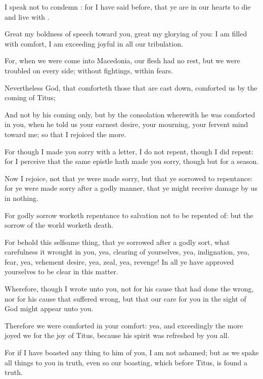 {I
speak
not
{}
to
condemn
{}:
for I have said
before,
that ye
are
in
our
hearts
to
die
and live
with
{}.

Great
{}
my boldness of
speech
toward
you,
great
{}
my
glorying
of
you: I am
filled with
comfort, I am
exceeding
joyful
in
all
our
tribulation.

For,
when we were
come
into
Macedonia,
our
flesh
had
no
rest,
but
we were
troubled
on every
side;
without
{}
fightings,
within
{}
fears.

Nevertheless
God, that
comforteth
those that are cast
down,
comforted
us
by the
coming of
Titus;

And
not
by
his
coming
only,
but
by the
consolation
wherewith he was
comforted
in
you, when he
told
us
your earnest
desire,
your
mourning,
your fervent
mind
toward
me; so
that
I
rejoiced the
more.

For though I
made
you sorry
with a
letter, I
do
not
repent,
though I did
repent:
for I
perceive
that the
same
epistle hath
made
you
sorry,
though
{}
but
for a
season.

Now I
rejoice,
not
that ye were made
sorry,
but
that ye
sorrowed
to
repentance:
for ye were made
sorry
after a godly
manner,
that ye might receive
damage
by
us
in
nothing.

For
godly
sorrow
worketh
repentance
to
salvation not to be repented
of:
but the
sorrow of the
world
worketh
death.

For
behold
this selfsame
thing,
that
ye
sorrowed
after a godly
sort,
what
carefulness it
wrought in
you,
yea,
{} clearing of
yourselves,
yea,
{}
indignation,
yea,
{}
fear,
yea,
{} vehement
desire,
yea,
{}
zeal,
yea,
{}
revenge!
In
all
{} ye have
approved
yourselves to
be
clear
in this
matter.

Wherefore,
though I
wrote unto
you,
{}
not for his
cause
that had done the
wrong,
nor for his
cause that suffered
wrong,
but that
our
care
for
you in the
sight of
God might
appear
unto
you.

Therefore we were
comforted
in
your
comfort: yea,
and
exceedingly the
more joyed
we
for the
joy of
Titus,
because
his
spirit was
refreshed
by
you
all.

For
if I have
boasted any
thing to
him
of
you, I
am
not
ashamed;
but
as we
spake all
things to
you
in
truth,
even
so
our
boasting,
which
{}
before
Titus, is
found a
truth.

}
